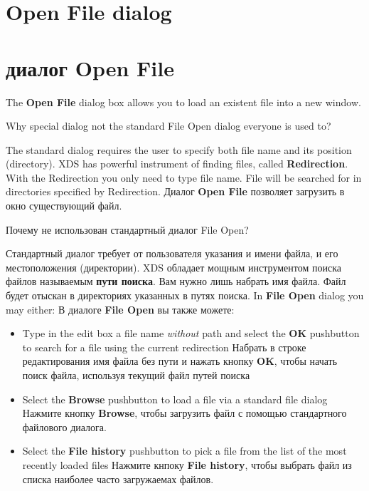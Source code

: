 \ifenglish
\section{Open File dialog}
 \else
\section{диалог Open File}
\fi
{}
\nominitoc

\ifenglish
The {\bf Open File} dialog box allows you to load an existent file
into a new window.

Why special dialog not the standard File Open dialog everyone is used to?

The standard dialog requires the user to specify both file name and its position
(directory). XDS has powerful instrument of finding files, called {\bf Redirection}.
With the Redirection you only need to type file name. File will be searched for
in directories specified by Redirection.
 \else
Диалог {\bf Open File}  позволяет загрузить в окно существующий файл.

Почему не использован стандартный диалог File Open?

Стандартный диалог требует от пользователя указания и имени файла, и его 
местоположения (директории). XDS обладает мощным инструментом поиска файлов 
называемым {\bf пути поиска}. Вам нужно лишь набрать имя файла. Файл будет отыскан
в директориях указанных в путях поиска.
\fi
\ifenglish
In {\bf File Open} dialog you may either:
 \else
В диалоге {\bf File Open} вы также можете:
\fi
\begin{itemize}
\item 
      \ifenglish
      Type in the edit box a file name {\em without}
      path and select the {\bf OK}
      pushbutton to search for a file using the current redirection
       \else
   Набрать в строке редактирования имя файла без пути и нажать
   кнопку {\bf OK}, чтобы начать поиск файла, используя текущий файл 
   путей поиска
    \fi
\item 
      \ifenglish
      Select the {\bf Browse} pushbutton to load a file via a
      standard file dialog
       \else
 Нажмите кнопку {\bf Browse}, чтобы загрузить файл с помощью стандартного 
 файлового диалога.
 \fi
\item 
      \ifenglish
      Select the {\bf File history} pushbutton to pick a file
      from the list of the most recently loaded files
       \else
  Нажмите кнпоку {\bf File history}, чтобы выбрать файл из списка 
  наиболее часто загружаемах файлов.
  \fi
\end{itemize}

